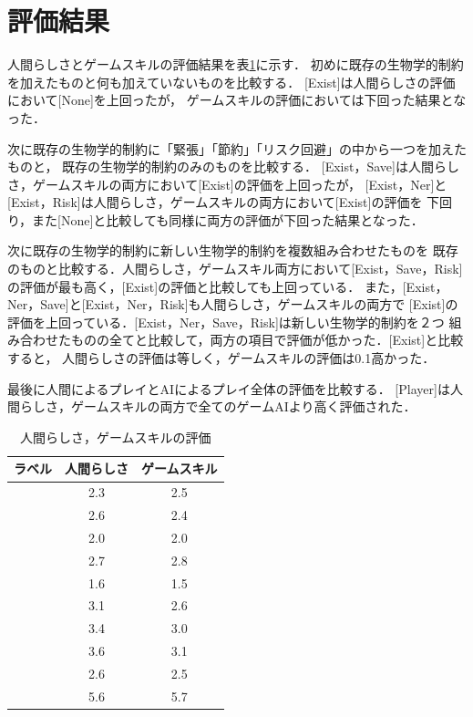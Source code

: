 \documentclass[a4paper,12pt,oneside,openany,titlepage]{jreport}
\begin{document}
 \section{評価結果}
 人間らしさとゲームスキルの評価結果を表\ref{kekka}に示す．
 初めに既存の生物学的制約を加えたものと何も加えていないものを比較する．
 [Exist]は人間らしさの評価において[None]を上回ったが，
 ゲームスキルの評価においては下回った結果となった．
 
 次に既存の生物学的制約に「緊張」「節約」「リスク回避」の中から一つを加えたものと，
 既存の生物学的制約のみのものを比較する．
 [Exist，Save]は人間らしさ，ゲームスキルの両方において[Exist]の評価を上回ったが，
 [Exist，Ner]と[Exist，Risk]は人間らしさ，ゲームスキルの両方において[Exist]の評価を
 下回り，また[None]と比較しても同様に両方の評価が下回った結果となった．
 
 次に既存の生物学的制約に新しい生物学的制約を複数組み合わせたものを
 既存のものと比較する．人間らしさ，ゲームスキル両方において[Exist，Save，Risk]
 の評価が最も高く，[Exist]の評価と比較しても上回っている．
 また，[Exist，Ner，Save]と[Exist，Ner，Risk]も人間らしさ，ゲームスキルの両方で
 [Exist]の評価を上回っている．[Exist，Ner，Save，Risk]は新しい生物学的制約を２つ
 組み合わせたものの全てと比較して，両方の項目で評価が低かった．[Exist]と比較すると，
 人間らしさの評価は等しく，ゲームスキルの評価は0.1高かった．
 
 最後に人間によるプレイとAIによるプレイ全体の評価を比較する．
 [Player]は人間らしさ，ゲームスキルの両方で全てのゲームAIより高く評価された．
 
 
 \begin{table}[!ht]
   \centering
   \caption{人間らしさ，ゲームスキルの評価}
   \label{kekka}
   \begin{tabular}{c|c|c}
   \hline
       ラベル & 人間らしさ & ゲームスキル \\ \hline
       [None] & 2.3 & 2.5 \\ \hline
       [Exist] & 2.6 & 2.4 \\ \hline
       [Exist,Ner] & 2.0 & 2.0 \\ \hline
       [Exist,Save] & 2.7 & 2.8 \\ \hline
       [Exist,Risk] & 1.6 & 1.5 \\ \hline
       [Exist,Ner,Save] & 3.1 & 2.6 \\ \hline
       [Exist,Ner,Risk] & 3.4 & 3.0 \\ \hline
       [Exist,Save,Risk] & 3.6 & 3.1 \\ \hline
       [Exist,Ner,Save,Risk] & 2.6 & 2.5 \\ \hline
       [Player] & 5.6 & 5.7 \\ \hline
   \end{tabular}
 \end{table}
 
\end{document}
